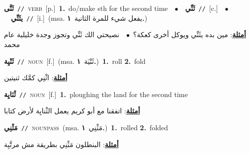\documentclass[10pt,a4paper,twoside]{article} %
\begin{document}
\begin{multicols}{2}
{\setlength\topsep{0pt}\textbf{\foreignlanguage{arabic}{ثَنَّى}}\ {\color{gray}\texttt{//}\color{black}}\ \textsc{verb}\ [p.]\ \textbf{1.}~do/make sth for the second time\ \ $\bullet$\ \ \setlength\topsep{0pt}\textbf{\foreignlanguage{arabic}{ثَنِّي}}\ {\color{gray}\texttt{//}\color{black}}\ [c.]\ \ $\bullet$\ \ \setlength\topsep{0pt}\textbf{\foreignlanguage{arabic}{يثَنِّي}}\ {\color{gray}\texttt{//}\color{black}}\ [i.]\ \color{gray}(msa. \foreignlanguage{arabic}{يفعل شيء للمرة الثانية}~\foreignlanguage{arabic}{\textbf{١.}})\color{black}\  \begin{flushright}\color{gray}\foreignlanguage{arabic}{\textbf{\underline{\foreignlanguage{arabic}{أمثلة}}}: مين بده يثَنِّي ويوكل أخرى كعكة؟\ $\bullet$\ \  نصيحتي الك ثَنِّي وتجوز وجدة خليلية عام محمد}\end{flushright}\color{black}} \vspace{2mm}

{\setlength\topsep{0pt}\textbf{\foreignlanguage{arabic}{ثَنْيِة}}\ {\color{gray}\texttt{//}\color{black}}\ \textsc{noun}\ [f.]\ \color{gray}(msa. \foreignlanguage{arabic}{ثَنْيَة}~\foreignlanguage{arabic}{\textbf{١.}})\color{black}\ \textbf{1.}~roll  \textbf{2.}~fold\  \begin{flushright}\color{gray}\foreignlanguage{arabic}{\textbf{\underline{\foreignlanguage{arabic}{أمثلة}}}: اثْنِي كمَّك ثنيتين}\end{flushright}\color{black}} \vspace{2mm}

{\setlength\topsep{0pt}\textbf{\foreignlanguage{arabic}{ثْنَايِة}}\ {\color{gray}\texttt{//}\color{black}}\ \textsc{noun}\ [f.]\ \textbf{1.}~ploughing the land for the second time\  \begin{flushright}\color{gray}\foreignlanguage{arabic}{\textbf{\underline{\foreignlanguage{arabic}{أمثلة}}}: اتفقنا مع أبو كريم يعمل الثْنايِة لأرض كتابا}\end{flushright}\color{black}} \vspace{2mm}

{\setlength\topsep{0pt}\textbf{\foreignlanguage{arabic}{مَثْنِي}}\ {\color{gray}\texttt{//}\color{black}}\ \textsc{noun\textunderscore pass}\ \color{gray}(msa. \foreignlanguage{arabic}{مَثْنِي}~\foreignlanguage{arabic}{\textbf{١.}})\color{black}\ \textbf{1.}~rolled  \textbf{2.}~folded\  \begin{flushright}\color{gray}\foreignlanguage{arabic}{\textbf{\underline{\foreignlanguage{arabic}{أمثلة}}}: البنطلون مَثْنِي بطريقة مش مرتَّبِة}\end{flushright}\color{black}} \vspace{2mm}


\end{multicols}
\end{document}
